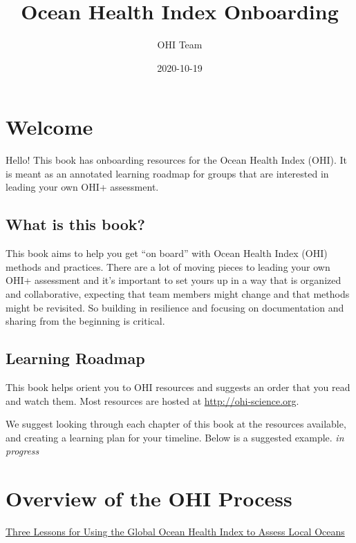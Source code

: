 \documentclass[
]{book}
\title{Ocean Health Index Onboarding}
\author{OHI Team}
\date{2020-10-19}
\begin{document}
\maketitle

{
\setcounter{tocdepth}{1}
\tableofcontents
}
\hypertarget{welcome}{%
\chapter{Welcome}\label{welcome}}

Hello! This book has onboarding resources for the Ocean Health Index (OHI). It is meant as an annotated learning roadmap for groups that are interested in leading your own OHI+ assessment.

\hypertarget{what-is-this-book}{%
\section{What is this book?}\label{what-is-this-book}}

This book aims to help you get ``on board'' with Ocean Health Index (OHI) methods and practices. There are a lot of moving pieces to leading your own OHI+ assessment and it's important to set yours up in a way that is organized and collaborative, expecting that team members might change and that methods might be revisited. So building in resilience and focusing on documentation and sharing from the beginning is critical.

\hypertarget{learning-roadmap}{%
\section{Learning Roadmap}\label{learning-roadmap}}

This book helps orient you to OHI resources and suggests an order that you read and watch them. Most resources are hosted at \url{http://ohi-science.org}.

We suggest looking through each chapter of this book at the resources available, and creating a learning plan for your timeline. Below is a suggested example. \emph{in progress}

\hypertarget{process}{%
\chapter{Overview of the OHI Process}\label{process}}

\href{https://ohi-science.org/news/three-lessons-global}{Three Lessons for Using the Global Ocean Health Index to Assess Local Oceans}
\end{document}
